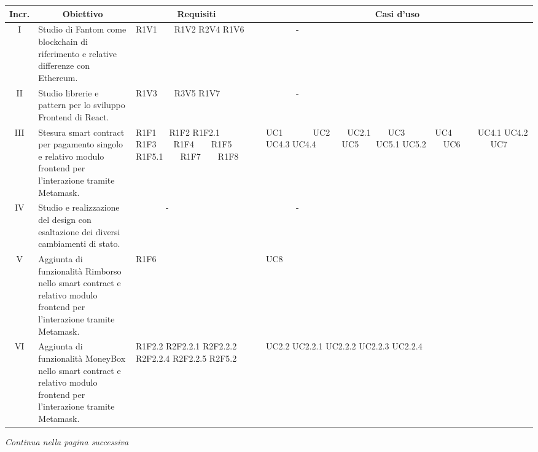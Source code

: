 \begin{table}[H]
  \centering
  \renewcommand{\arraystretch}{1.8}
  \begin{tabular}{c|p{6cm}|p{2cm}|p{2cm}}
    \rowcolor[HTML]{125E28}
    \color[HTML]{FFFFFF}\textbf{Incr.}
    & \multicolumn{1}{c}{\color[HTML]{FFFFFF}\textbf{Obiettivo}}
    & \multicolumn{1}{c}{\color[HTML]{FFFFFF}\textbf{Requisiti}}
    & \multicolumn{1}{c}{\color[HTML]{FFFFFF}\textbf{Casi d'uso}}\\
    \hline
    I	& Studio di Fantom come blockchain di riferimento e relative differenze con Ethereum.	& R1V1\ \ \ \  R1V2 R2V4 R1V6 & \ \ \ \ \ \ \ - \\
    II & Studio librerie e pattern per lo sviluppo Frontend di React. & R1V3\ \ \ \  R3V5 R1V7 & \ \ \ \ \ \ \ - \\
    III	& Stesura smart contract per pagamento singolo e relativo modulo frontend per l'interazione tramite Metamask. & R1F1\ \ \  R1F2 R1F2.1 R1F3\ \ \ \ R1F4\ \ \ \  R1F5 R1F5.1\ \ \ \  R1F7\ \ \ \  R1F8 & UC1\ \ \ \ \ \ \ UC2\ \ \ \ UC2.1\ \ \ \   UC3\ \ \ \ \ \ \ UC4\ \ \ \ \ \ UC4.1 UC4.2 UC4.3 UC4.4\ \ \ \ \ \ UC5\ \ \ \ UC5.1 UC5.2\ \ \ \ UC6\ \ \ \ \ \ \  UC7 \\
    IV & Studio e realizzazione del design con esaltazione dei diversi cambiamenti di stato. & \ \ \ \ \ \ \ - & \ \ \ \ \ \ \ - \\
    V	& Aggiunta di funzionalità Rimborso nello smart contract e relativo modulo frontend per l'interazione tramite Metamask. & R1F6 & UC8 \\
    VI & Aggiunta di funzionalità MoneyBox nello smart contract e relativo modulo frontend per l'interazione tramite Metamask.  & R1F2.2 R2F2.2.1 R2F2.2.2 R2F2.2.4 R2F2.2.5 R2F5.2 & UC2.2 UC2.2.1 UC2.2.2 UC2.2.3 UC2.2.4 \\
  \end{tabular}
\end{table}
\begin{center}
  \textit{\small Continua nella pagina successiva}
\end{center}
